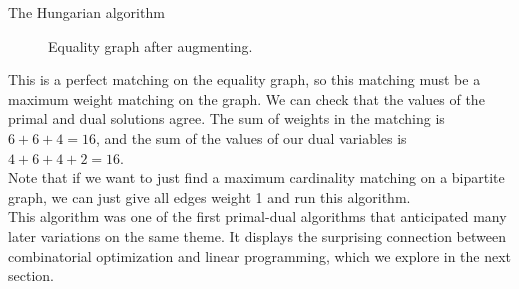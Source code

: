 \documentclass[11pt]{article}
\renewcommand{\'}{^{'}}
\begin{document}
\begin{section}{The Hungarian algorithm}
\begin{figure}[H]
		\caption{Equality graph after augmenting.}
	\end{figure}
	This is a perfect matching on the equality graph, so this matching must be a maximum weight 
	matching on the graph. We can check that the values of the primal and dual solutions agree. 
	The sum of weights in the matching is $6+6+4 = 16$, and the sum of the values of our 
	dual variables is $4+6+4+2 = 16$.\\
	Note that if we want to just find a maximum cardinality matching on a bipartite graph, 
	we can just give all edges weight 1 and run this algorithm.\\
	This algorithm was one of the first primal-dual algorithms that anticipated many later 
	variations on the same theme. It displays the surprising connection between combinatorial 
	optimization and linear programming, which we explore in the next section.
\end{section}
\end{document}

